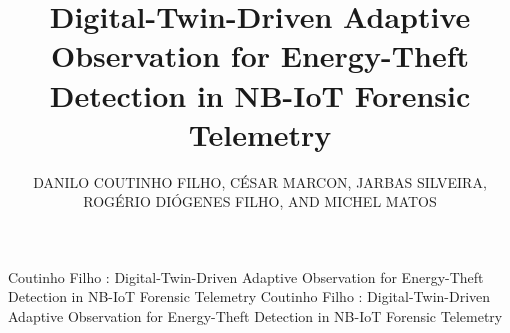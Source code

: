 \documentclass{ieeeaccess}
\begin{document}

\title{Digital-Twin-Driven Adaptive Observation for Energy-Theft Detection in NB-IoT Forensic Telemetry}

\author{
\uppercase{Danilo Coutinho Filho},
\uppercase{César Marcon},
\uppercase{Jarbas Silveira},
\uppercase{Rogério Diógenes Filho},
AND \uppercase{Michel Matos}
}

\address[1]{Department of Teleinformatics Engineering, Federal University of Ceará (UFC), Fortaleza, Brazil}
\address[2]{Pontifical Catholic University of Rio Grande do Sul (PUCRS), Porto Alegre, Brazil}
\address[3]{Center of Studies and Research of the North and Northeast (NEPEN), Fortaleza, Brazil}
\address[4]{EDP South America, São José dos Campos, Brazil}


\markboth
{Coutinho Filho \headeretal: Digital-Twin-Driven Adaptive Observation for Energy-Theft Detection in NB-IoT Forensic Telemetry}
{Coutinho Filho \headeretal: Digital-Twin-Driven Adaptive Observation for Energy-Theft Detection in NB-IoT Forensic Telemetry}

\end{document}

